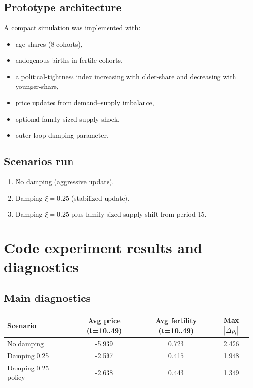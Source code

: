 \documentclass[11pt]{article}
\begin{document}
\subsection*{Prototype architecture}
A compact simulation was implemented with:
\begin{itemize}
\item age shares (8 cohorts),
\item endogenous births in fertile cohorts,
\item a political-tightness index increasing with older-share and decreasing with younger-share,
\item price updates from demand--supply imbalance,
\item optional family-sized supply shock,
\item outer-loop damping parameter.
\end{itemize}

\subsection*{Scenarios run}
\begin{enumerate}
\item No damping (aggressive update).
\item Damping $\xi=0.25$ (stabilized update).
\item Damping $\xi=0.25$ plus family-sized supply shift from period 15.
\end{enumerate}

\section{Code experiment results and diagnostics}
\subsection*{Main diagnostics}
\begin{center}
\begin{tabular}{lccc}
\toprule
Scenario & Avg price (t=10..49) & Avg fertility (t=10..49) & Max $|\Delta p_t|$ \\
\midrule
No damping & -5.939 & 0.723 & 2.426 \\
Damping 0.25 & -2.597 & 0.416 & 1.948 \\
Damping 0.25 + policy & -2.638 & 0.443 & 1.349 \\
\bottomrule
\end{tabular}
\end{center}
\end{document}
